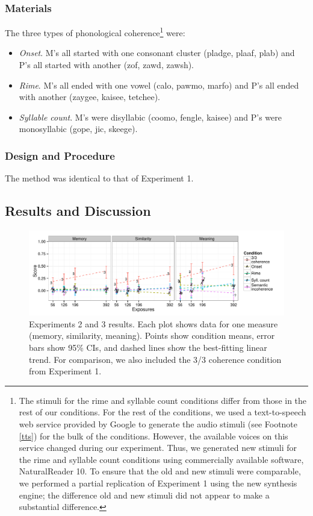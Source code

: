 \documentclass[man,floatsintext]{apa6}
\begin{document}
\subsubsection{Materials}
The three types of phonological coherence\footnote{\label{change-of-stimuli} The stimuli for the rime and syllable count conditions differ from those in the rest of our conditions. For the rest of the conditions, we used a text-to-speech web service provided by Google to generate the audio stimuli (see Footnote \ref{tts}) for the bulk of the conditions. However, the available voices on this service changed during our experiment. Thus, we generated new stimuli for the rime and syllable count conditions using commercially available software, NaturalReader 10. To ensure that the old and new stimuli were comparable, we performed a partial replication of Experiment 1 using the new synthesis engine; the difference old and new stimuli did not appear to make a substantial difference.} were:
\begin{itemize}
\item \emph{Onset}. M's all started with one consonant cluster (pladge, plaaf, plab) and P's all started with another (zof, zawd, zawsh).
\item \emph{Rime}. M's all ended with one vowel (calo, pawmo, marfo) and P's all ended with another (zaygee, kaisee, tetchee).
\item \emph{Syllable count}. M's were disyllabic (coomo, fengle, kaisee) and P's were monosyllabic (gope, jic, skeege).
\end{itemize} 

\subsubsection{Design and Procedure} The method was identical to that of Experiment 1.

\subsection{Results and Discussion}

\begin{figure}[t]
  \begin{center}
    \includegraphics[width=1.0\linewidth]{x23.pdf}
    \caption{Experiments 2 and 3 results. Each plot shows data for one measure (memory, similarity, meaning). Points show condition means, error bars show 95\% CIs, and dashed lines show the best-fitting linear trend. For comparison, we also included the 3/3 coherence condition from Experiment 1.}
    \label{expt23-results}
  \end{center}
\end{figure}
\end{document}
